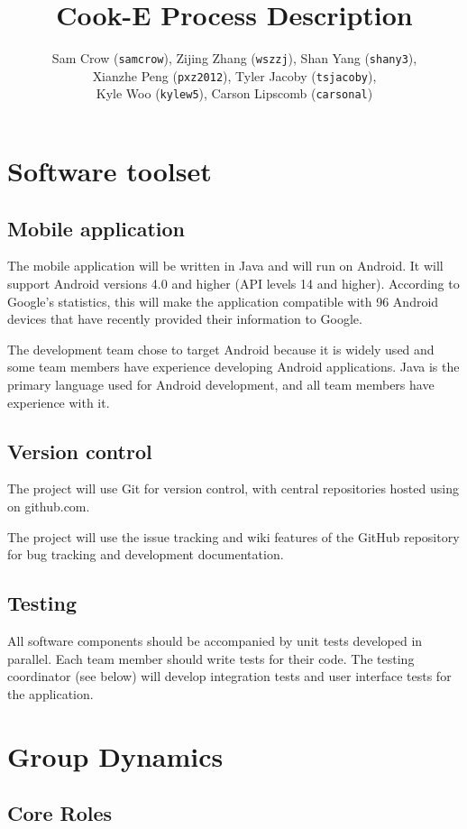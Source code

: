 \documentclass[10pt]{article}
\title{Cook-E Process Description}
\author{Sam Crow (\texttt{samcrow}), Zijing Zhang (\texttt{wszzj}), Shan Yang (\texttt{shany3}),\\ Xianzhe Peng (\texttt{pxz2012}), Tyler Jacoby (\texttt{tsjacoby}),\\ Kyle Woo (\texttt{kylew5}), Carson Lipscomb (\texttt{carsonal})}
\begin{document}
\maketitle{}


\section{Software toolset}

\subsection{Mobile application}

The mobile application will be written in Java and will run on Android. It will support Android versions 4.0 and higher
(API levels 14 and higher). According to Google's statistics, this will make the application compatible with 96%
Android devices that have recently provided their information to Google.

The development team chose to target Android because it is widely used and some team members have experience developing
Android applications. Java is the primary language used for Android development, and all team members have experience with
it.

\subsection{Version control}

The project will use Git for version control, with central repositories hosted using on github.com.

The project will use the issue tracking and wiki features of the GitHub repository for bug tracking and development documentation.
\subsection{Testing}

All software components should be accompanied by unit tests developed in parallel.
Each team member should write tests for their code.
The testing coordinator (see below) will develop integration tests and user interface tests for the application.

\section{Group Dynamics}

\subsection{Core Roles}
\end{document}
